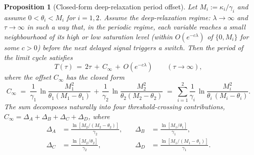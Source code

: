 \documentclass[sn-mathphys,Numbered]{sn-jnl}
\theoremstyle{thmstyleone}
\newtheorem{proposition}[theorem]{Proposition}
\theoremstyle{thmstyletwo}
\theoremstyle{thmstylethree}
\begin{document}
\begin{proposition}[Closed-form deep-relaxation period offset]
\label{prop:Cinfty}
Let $M_i:=\kappa_i/\gamma_i$ and assume $0<\theta_i<M_i$ for $i=1,2$.
Assume the deep-relaxation regime: $\lambda\to\infty$ and $\tau\to\infty$
in such a way that, in the periodic regime, each variable reaches a small
neighbourhood of its high or low saturation level (within $O(e^{-c\lambda})$
of $\{0,M_i\}$ for some $c>0$) before the next delayed signal triggers a
switch. Then the period of the limit cycle satisfies
\begin{equation}
T(\tau) \,=\, 2\tau \,+\, C_\infty \,+\, O(e^{-c\lambda})
\qquad(\tau\to\infty),
\label{eq:Cinfty_asymp}
\end{equation}
where the offset $C_\infty$ has the closed form
\begin{equation}
C_\infty
\;=\; \frac{1}{\gamma_1}\,\ln\!\frac{M_1^{2}}{\theta_1(M_1-\theta_1)}
   \,+\,\frac{1}{\gamma_2}\,\ln\!\frac{M_2^{2}}{\theta_2(M_2-\theta_2)}
\;=\; \sum_{i=1}^{2}\frac{1}{\gamma_i}\,
       \ln\!\frac{M_i^{2}}{\theta_i\,(M_i-\theta_i)}.
\label{eq:Cinf}
\end{equation}
The sum decomposes naturally into four threshold-crossing
contributions, $C_\infty = \Delta_A+\Delta_B+\Delta_C+\Delta_D$, where
\begin{equation}
\begin{aligned}
\Delta_A&=\frac{\ln[M_2/(M_2-\theta_2)]}{\gamma_2},
&\quad
\Delta_B&=\frac{\ln[M_1/\theta_1]}{\gamma_1},\\[4pt]
\Delta_C&=\frac{\ln[M_2/\theta_2]}{\gamma_2},
&\quad
\Delta_D&=\frac{\ln[M_1/(M_1-\theta_1)]}{\gamma_1}.
\end{aligned}
\label{eq:phase_durations}
\end{equation}
\end{proposition}
\end{document}
